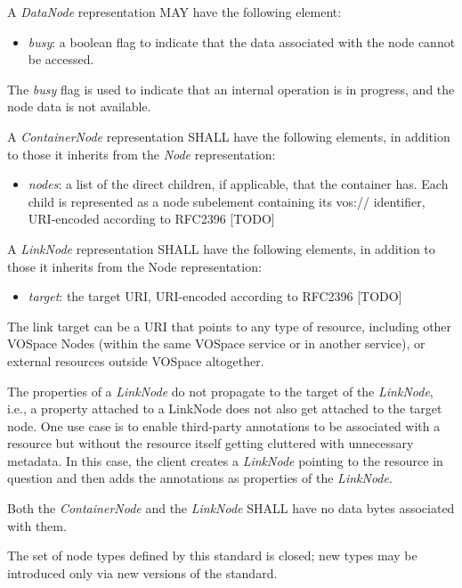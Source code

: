 \documentclass[11pt,a4paper]{ivoa}
\begin{document}
A \emph{DataNode} representation MAY have the following element:

\begin{itemize}
    \item \emph{busy}: a boolean flag to indicate that the data associated with the node cannot be accessed.
\end{itemize}

The \emph{busy} flag is used to indicate that an internal operation is in progress, and the node data is not available.

A \emph{ContainerNode} representation SHALL have the following elements, in addition to those it inherits from the \emph{Node} representation:

\begin{itemize}
    \item \emph{nodes}: a list of the direct children, if applicable, that the container has. Each child is represented as a node subelement containing its vos:// identifier, URI-encoded according to RFC2396 [TODO]
\end{itemize}

A \emph{LinkNode} representation SHALL have the following elements, in addition to those it inherits from the Node representation:

\begin{itemize}
    \item \emph{target}: the target URI, URI-encoded according to RFC2396 [TODO]
\end{itemize}

The link target can be a URI that points to any type of resource, including other VOSpace Nodes (within the same VOSpace service or in another service), or external resources outside VOSpace altogether.

The properties of a \emph{LinkNode} do not propagate to the target of the \emph{LinkNode}, i.e., a property attached to a LinkNode does not also get attached to the target node. One use case is to enable third-party annotations to be associated with a resource but without the resource itself getting cluttered with unnecessary metadata. In this case, the client creates a \emph{LinkNode} pointing to the resource in question and then adds the annotations as properties of the \emph{LinkNode}.

Both the \emph{ContainerNode} and the \emph{LinkNode} SHALL have no data bytes associated with them.

The set of node types defined by this standard is closed; new types may be introduced only via new versions of the standard.
\end{document}
